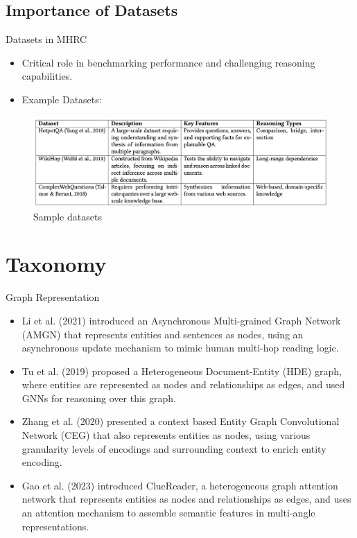 \documentclass[10pt]{beamer}
\begin{document}
\subsection{Importance of Datasets}

\begin{frame}{Datasets in MHRC}
  \begin{itemize}
    \item Critical role in benchmarking performance and challenging reasoning capabilities.
    \item Example Datasets:
  \end{itemize}

  \begin{figure}[t] %
    \centering
    \includegraphics[width=\linewidth]{fig/ext_fig/sample_datasets.png} %
    \caption{Sample datasets}
    \label{fig:sample_datasets} %
  \end{figure}

\end{frame}


\section{Taxonomy}

\begin{frame}[fragile]{Graph Representation}
  \begin{itemize}
    \item Li et al. (2021) \cite{RN131} introduced an Asynchronous Multi-grained Graph Network (AMGN) that represents entities and sentences as nodes, using an asynchronous update mechanism to mimic human multi-hop reading logic.
    \item Tu et al. (2019) \cite{RN124} proposed a Heterogeneous Document-Entity (HDE) graph, where entities are represented as nodes and relationships as edges, and used GNNs for reasoning over this graph.
    \item Zhang et al. (2020) \cite{RN170} presented a context based Entity Graph Convolutional Network (CEG) that also represents entities as nodes, using various granularity levels of encodings and surrounding context 
to enrich entity encoding.
    \item Gao et al. (2023) \cite{RN136} introduced ClueReader, a heterogeneous graph attention network that represents entities as nodes and relationships as edges, and uses an attention mechanism to assemble semantic features in multi-angle representations.
  \end{itemize}
\end{frame}
\end{document}
